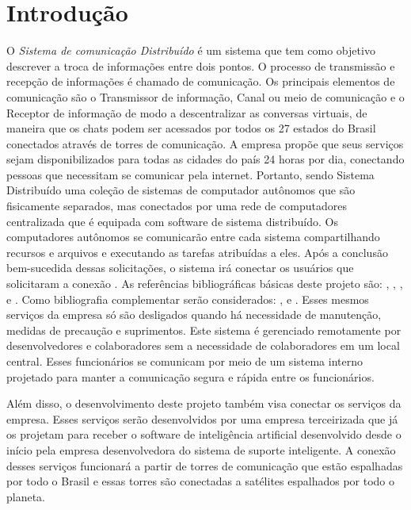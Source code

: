 

\chapter{ Introdu\c{c}\~{a}o}

O \textit{Sistema de comunicação Distribuído} é um sistema que tem como objetivo descrever a troca de informações entre dois pontos. O processo de transmissão e recepção de informações é chamado de comunicação. Os principais elementos de comunicação são o Transmissor de informação, Canal ou meio de comunicação e o Receptor de informação de modo a descentralizar as conversas virtuais, de maneira que os chats podem ser acessados por todos os 27 estados do Brasil conectados através de torres de comunicação.
A empresa propõe que seus serviços sejam disponibilizados para todas as cidades do país 24 horas por dia, conectando pessoas que necessitam se comunicar pela internet. Portanto, sendo Sistema Distribuído uma coleção de sistemas de computador autônomos que são fisicamente separados, mas conectados por uma rede de computadores centralizada que é equipada com software de sistema distribuído. Os computadores autônomos se comunicarão entre cada sistema compartilhando recursos e arquivos e executando as tarefas atribuídas a eles. Após a conclusão bem-sucedida dessas solicitações, o sistema irá conectar os usuários que solicitaram a conexão \cite{devasishakula503_2022}.
 As refer\^{e}ncias bibliogr\'{a}ficas b\'{a}sicas deste projeto s\~{a}o: \cite{Dennis2014}, \cite{Engholm2013}, \cite{Guedes2011},  \cite{Sommerville2018} e \cite{Wazlawick2011}. Como bibliografia complementar ser\~{a}o considerados: \cite{Satzinger2012}, \cite{Shelly2012} e  \cite{Furgeri2013}.
Esses mesmos serviços da empresa só são desligados quando há necessidade de manutenção, medidas de precaução e suprimentos. Este sistema é gerenciado remotamente por desenvolvedores e colaboradores sem a necessidade de colaboradores em um local central. Esses funcionários se comunicam por meio de um sistema interno projetado para manter a comunicação segura e rápida entre os funcionários.

Além disso, o desenvolvimento deste projeto também visa conectar os serviços da empresa. Esses serviços serão desenvolvidos por uma empresa terceirizada que já os projetam para receber o software de inteligência artificial desenvolvido desde o início pela empresa desenvolvedora do sistema de suporte inteligente. A conexão desses serviços funcionará a partir de torres de comunicação que estão espalhadas por todo o Brasil e essas torres são conectadas a satélites espalhados por todo o planeta.

